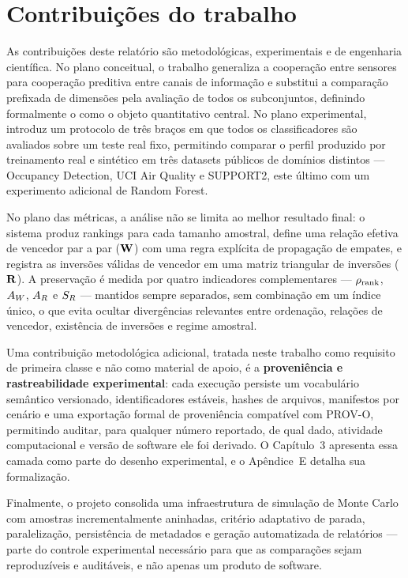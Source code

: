 \section{Contribuições do trabalho}

As contribuições deste relatório são metodológicas, experimentais e de engenharia científica. No plano conceitual, o trabalho generaliza a cooperação entre sensores para cooperação preditiva entre canais de informação e substitui a comparação prefixada de dimensões pela avaliação de todos os subconjuntos, definindo formalmente o \PredictiveCooperationProfile{} como o objeto quantitativo central. No plano experimental, introduz um protocolo de três braços em que todos os classificadores são avaliados sobre um teste real fixo, permitindo comparar o perfil produzido por treinamento real e sintético em três datasets públicos de domínios distintos --- Occupancy Detection, UCI Air Quality e SUPPORT2, este último com um experimento adicional de Random Forest.

No plano das métricas, a análise não se limita ao melhor resultado final: o sistema produz rankings para cada tamanho amostral, define uma relação efetiva de vencedor par a par ($\mathbf{W}$) com uma regra explícita de propagação de empates, e registra as inversões válidas de vencedor em uma matriz triangular de inversões ($\mathbf{R}$). A preservação é medida por quatro indicadores complementares --- $\rho_{\mathrm{rank}}$, $A_W$, $A_R$ e $S_R$ --- mantidos sempre separados, sem combinação em um índice único, o que evita ocultar divergências relevantes entre ordenação, relações de vencedor, existência de inversões e regime amostral.

Uma contribuição metodológica adicional, tratada neste trabalho como requisito de primeira classe e não como material de apoio, é a \textbf{proveniência e rastreabilidade experimental}: cada execução persiste um vocabulário semântico versionado, identificadores estáveis, hashes de arquivos, manifestos por cenário e uma exportação formal de proveniência compatível com PROV-O, permitindo auditar, para qualquer número reportado, de qual dado, atividade computacional e versão de software ele foi derivado. O Capítulo~3 apresenta essa camada como parte do desenho experimental, e o Apêndice~E detalha sua formalização.

Finalmente, o projeto consolida uma infraestrutura de simulação de Monte Carlo com amostras incrementalmente aninhadas, critério adaptativo de parada, paralelização, persistência de metadados e geração automatizada de relatórios --- parte do controle experimental necessário para que as comparações sejam reproduzíveis e auditáveis, e não apenas um produto de software.


